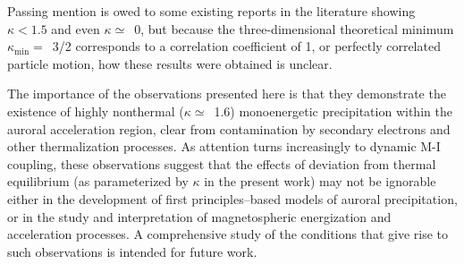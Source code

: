   Passing mention is owed to some existing reports in the literature showing
  $\kappa < 1.5$ and even $\kappa \simeq$~0, but because the three-dimensional
  theoretical minimum $\kappa_{\mathrm{min}} =$~3/2 corresponds to a correlation
  coefficient of 1, or perfectly correlated particle motion, how these results
  were obtained is unclear.

  The importance of the observations presented here is that they demonstrate the
  existence of highly nonthermal ($\kappa \simeq$~1.6) monoenergetic
  precipitation within the auroral acceleration region, clear from contamination
  by secondary electrons and other thermalization processes. As attention turns
  increasingly to dynamic M-I coupling, these observations suggest that the
  effects of deviation from thermal equilibrium (as parameterized by $\kappa$ in
  the present work) may not be ignorable either in the development of first
  principles--based models of auroral precipitation, or in the study and
  interpretation of magnetospheric energization and acceleration processes. A
  comprehensive study of the conditions that give rise to such observations is
  intended for future work.



  



